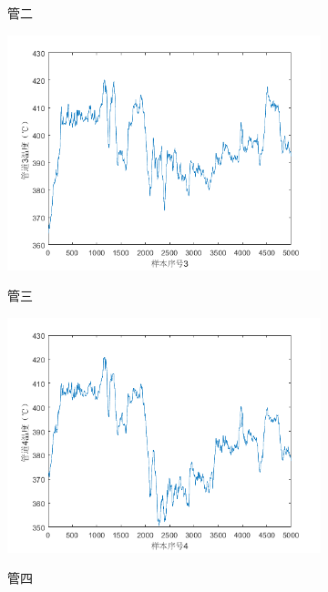 \begin{figure}
\begin{subfigure}{0.32\textwidth}
                \label{p1_2}
                \caption{管二}
            \end{subfigure}
            \begin{subfigure}{0.32\textwidth}
                \includegraphics[width=\textwidth]{figures/p1_3.png}
                \label{p1_3}
                \caption{管三}
            \end{subfigure}
            \begin{subfigure}{0.32\textwidth}
                \includegraphics[width=\textwidth]{figures/p1_4.png}
                \label{p1_4}
                \caption{管四}
            \end{subfigure}
            \begin{subfigure}{0.32\textwidth}

\end{subfigure}
\end{figure}
